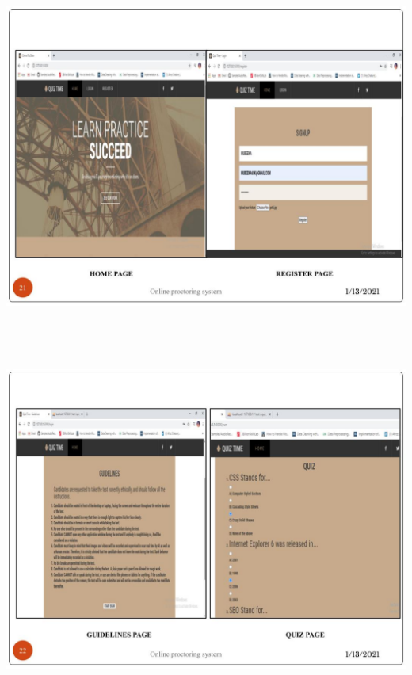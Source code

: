 \documentclass[12pt]{report}
\begin{document}
\includegraphics[width=17cm,height=12cm]{INTERNSHIP SAMPLE PRESENTATION (20)}\\
\includegraphics[width=17cm,height=12cm]{INTERNSHIP SAMPLE PRESENTATION (21)}\\
\end{document}
